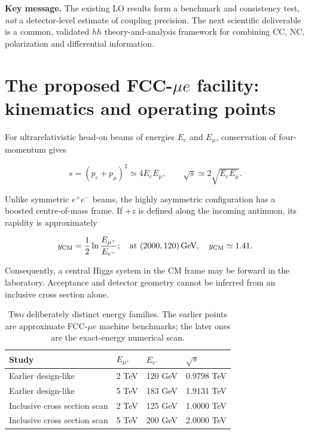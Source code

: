 \documentclass[12pt,a4paper]{article}
\newcommand{\newnote}{\clearpage}
\newcommand{\smallsource}[1]{\par\vspace{-2pt}{\footnotesize\color{gray}\raggedright\emph{Source/status: #1}\par}}
\begin{document}
\textbf{Key message.} The existing LO results form a benchmark and 
consistency test, \emph{not} a detector-level estimate of coupling precision. 
The next scientific deliverable is a common, validated $hh$ theory-and-analysis framework 
for combining CC, NC, polarization and differential information. 




\newnote

\section{The proposed FCC-$\mu e$ facility: kinematics and operating points}

For ultrarelativistic head-on beams of energies $E_e$ and $E_\mu$, conservation of four-momentum gives

\begin{equation}
 s=(p_e+p_\mu)^2\simeq4E_eE_\mu,\qquad \sqrt{s}\simeq 2\sqrt{E_eE_\mu}.
 \label{eq:s}
\end{equation}

Unlike symmetric $e^+e^-$ beams, the highly asymmetric configuration has a boosted centre-of-mass frame. If $+z$ is defined along the incoming antimuon, its rapidity is approximately

\begin{equation}
 y_{\rm CM}=\frac12\ln\frac{E_{\mu^+}}{E_{e^-}};
 \quad \text{at }(2000,120)\,{\rm GeV},\quad y_{\rm CM}\simeq1.41.
\end{equation}

Consequently, a central Higgs system in the CM frame may be forward in the laboratory. Acceptance and detector geometry cannot be inferred from an inclusive cross section alone.



\begin{table}[H]
\centering\small
\caption{Two deliberately distinct energy families. The earlier points are approximate FCC-$\mu e$ machine benchmarks; the later ones are the exact-energy numerical scan.}
\begin{tabular}{@{}llll@{}}\toprule
Study & $E_{\mu^+}$ & $E_{e^-}$ & $\sqrt{s}$\\\midrule
Earlier design-like & 2 TeV & 120 GeV & 0.9798 TeV\\
Earlier design-like & 5 TeV & 183 GeV & 1.9131 TeV\\
Inclusive cross section scan & 2 TeV & 125 GeV & 1.0000 TeV\\
Inclusive cross section scan & 5 TeV & 200 GeV & 2.0000 TeV\\\bottomrule
\end{tabular}
\end{table}
\end{document}
